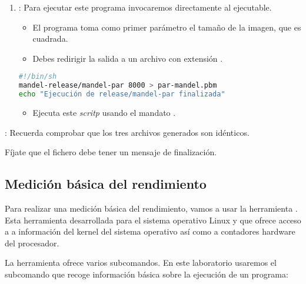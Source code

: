 \begin{enumerate}
  \item {}: Para ejecutar este programa invocaremos directamente al
        ejecutable.
    \begin{itemize}
      \item El programa toma como primer parámetro el tamaño de la imagen, que es cuadrada.
      \item Debes redirigir la salida a un archivo con extensión .
    \end{itemize}

\begin{lstlisting}[language=bash,title={Archivo: run-par-mandel.sh},frame=single]
#!/bin/sh
mandel-release/mandel-par 8000 > par-mandel.pbm
echo "Ejecución de release/mandel-par finalizada"
\end{lstlisting}
    \begin{itemize}
      \item Ejecuta este \emph{scritp} usando el mandato .
    \end{itemize}
\end{enumerate}


: Recuerda comprobar que los tres archivos 
generados son idénticos.

Fíjate que el fichero  debe tener un mensaje de finalización.

\subsection{Medición básica del rendimiento}

Para realizar una medición básica del rendimiento, vamos a usar la
herramienta . Esta herramienta desarrollada para el sistema
operativo Linux y que ofrece acceso a a información del kernel
del sistema operativo así como a contadores hardware del procesador.

La herramienta  ofrece varios subcomandos. En este
laboratorio usaremos el subcomando  que recoge información
básica sobre la ejecución de un programa:

